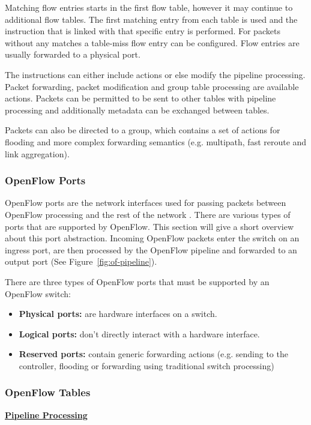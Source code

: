 Matching flow entries starts in the first flow table, however it may continue to additional flow tables. The first matching entry from each table is used and the instruction that is linked with that specific entry is performed. For packets without any matches a table-miss flow entry can be configured. Flow entries are usually forwarded to a physical port.

The instructions can either include actions or else modify the pipeline processing. Packet forwarding, packet modification and group table processing are available actions. Packets can be permitted to be sent to other tables with pipeline processing and additionally metadata can be exchanged between tables.

Packets can also be directed to a group, which contains a set of actions for flooding and more complex forwarding semantics (e.g. multipath, fast reroute and link aggregation).

\subsubsection{OpenFlow Ports}
OpenFlow ports are the network interfaces used for passing packets between OpenFlow processing and the rest of the network \cite{ofspecification}.
There are various types of ports that are supported by OpenFlow. This section will give a short overview about this port abstraction.
Incoming OpenFlow packets enter the switch on an ingress port, are then processed by the OpenFlow pipeline and forwarded to an output port (See Figure~\ref{fig:of-pipeline}).


There are three types of OpenFlow ports that must be supported by an OpenFlow switch:
\begin{itemize}
\item \textbf{Physical ports:} are hardware interfaces on a switch.
\item \textbf{Logical ports:} don't directly interact  with a hardware interface.
\item \textbf{Reserved ports:} contain generic forwarding actions (e.g. sending to the controller, flooding or forwarding using traditional switch processing)
\end{itemize}

\subsubsection{OpenFlow Tables}

\textbf{\underline{Pipeline Processing}}

